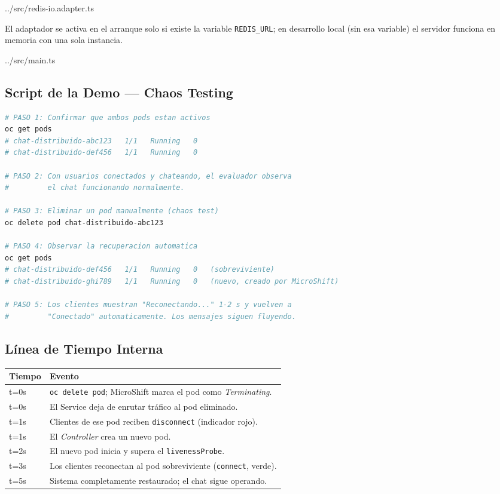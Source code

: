 \documentclass[11pt,a4paper]{article}
\begin{document}

  {../src/redis-io.adapter.ts}

El adaptador se activa en el arranque solo si existe la variable
\texttt{REDIS\_URL}; en desarrollo local (sin esa variable) el servidor funciona
en memoria con una sola instancia.


  {../src/main.ts}

\subsection{Script de la Demo --- Chaos Testing}
\begin{lstlisting}[language=bash]
# PASO 1: Confirmar que ambos pods estan activos
oc get pods
# chat-distribuido-abc123   1/1   Running   0
# chat-distribuido-def456   1/1   Running   0

# PASO 2: Con usuarios conectados y chateando, el evaluador observa
#         el chat funcionando normalmente.

# PASO 3: Eliminar un pod manualmente (chaos test)
oc delete pod chat-distribuido-abc123

# PASO 4: Observar la recuperacion automatica
oc get pods
# chat-distribuido-def456   1/1   Running   0   (sobreviviente)
# chat-distribuido-ghi789   1/1   Running   0   (nuevo, creado por MicroShift)

# PASO 5: Los clientes muestran "Reconectando..." 1-2 s y vuelven a
#         "Conectado" automaticamente. Los mensajes siguen fluyendo.
\end{lstlisting}

\subsection{Línea de Tiempo Interna}
\renewcommand{\arraystretch}{1.25}
\begin{tabularx}{\linewidth}{>{\ttfamily}l X}
\toprule
\normalfont\bfseries Tiempo & \bfseries Evento \\
\midrule
t=0s & \texttt{oc delete pod}; MicroShift marca el pod como \emph{Terminating}. \\
t=0s & El Service deja de enrutar tráfico al pod eliminado. \\
t=1s & Clientes de ese pod reciben \texttt{disconnect} (indicador rojo). \\
t=1s & El \emph{Controller} crea un nuevo pod. \\
t=2s & El nuevo pod inicia y supera el \texttt{livenessProbe}. \\
t=3s & Los clientes reconectan al pod sobreviviente (\texttt{connect}, verde). \\
t=5s & Sistema completamente restaurado; el chat sigue operando. \\
\bottomrule
\end{tabularx}
\end{document}
